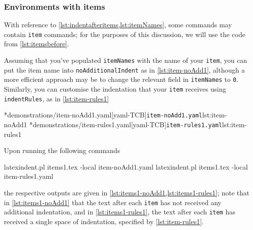 \subsubsection{Environments with items}
	With reference to \vref{lst:indentafteritems,lst:itemNames}, some commands may contain
	\texttt{item} commands; for the purposes of this discussion, we will use the
	code from \vref{lst:itemsbefore}.

	Assuming that you've populated \texttt{itemNames} with the name of your
	\texttt{item}, you can put the item name into \texttt{noAdditionalIndent} as in
	\cref{lst:item-noAdd1}, although a more efficient approach may be to change the relevant
	field in \texttt{itemNames} to \texttt{0}. Similarly, you can customise
	the indentation that your \texttt{item} receives using \texttt{indentRules},
	as in \cref{lst:item-rules1}

	\begin{cmhtcbraster}[raster column skip=.1\linewidth]
		\cmhlistingsfromfile[style=yaml-LST]*{demonstrations/item-noAdd1.yaml}[yaml-TCB]{\texttt{item-noAdd1.yaml}}{lst:item-noAdd1}
		\cmhlistingsfromfile[style=yaml-LST]*{demonstrations/item-rules1.yaml}[yaml-TCB]{\texttt{item-rules1.yaml}}{lst:item-rules1}
	\end{cmhtcbraster}

	Upon running the following commands
	\begin{commandshell}
latexindent.pl items1.tex -local item-noAdd1.yaml  
latexindent.pl items1.tex -local item-rules1.yaml  
\end{commandshell}
	the respective outputs are given in \cref{lst:items1-noAdd1,lst:items1-rules1}; note that in
	\cref{lst:items1-noAdd1} that the text after each \texttt{item} has not received
	any additional indentation, and in \cref{lst:items1-rules1}, the text after each
	\texttt{item} has received a single space of indentation, specified by
	\cref{lst:item-rules1}.

	\begin{minipage}{.45\textwidth}
	\end{minipage}
	\hfill
	\begin{minipage}{.45\textwidth}
	\end{minipage}

